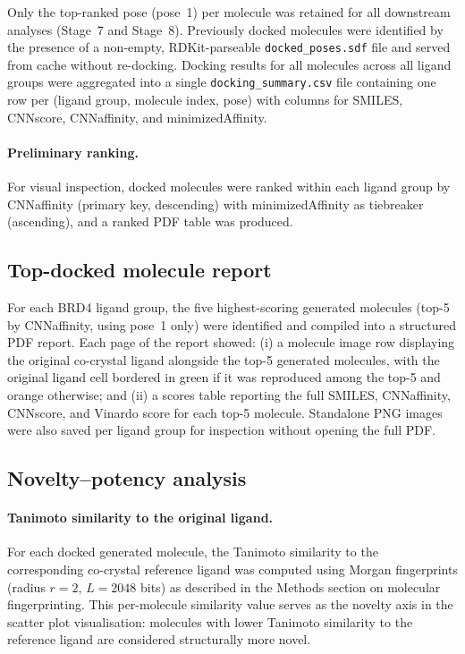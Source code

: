 \documentclass[a4paper,12pt]{article}
\begin{document}
\noindent Only the top-ranked pose (pose~1) per molecule was retained
for all downstream analyses (Stage~7 and Stage~8).
Previously docked molecules were identified by the presence of a
non-empty, RDKit-parseable \texttt{docked\_poses.sdf} file and
served from cache without re-docking.
Docking results for all molecules across all ligand groups were
aggregated into a single \texttt{docking\_summary.csv} file
containing one row per (ligand group, molecule index, pose) with
columns for SMILES, CNNscore, CNNaffinity, and minimizedAffinity.
 
\paragraph{Preliminary ranking.}
For visual inspection, docked molecules were ranked within each
ligand group by CNNaffinity (primary key, descending) with
minimizedAffinity as tiebreaker (ascending), and a ranked PDF
table was produced.
 
\subsection{Top-docked molecule report }
 
For each BRD4 ligand group, the five highest-scoring generated
molecules (top-5 by CNNaffinity, using pose~1 only) were
identified and compiled into a structured PDF report.
Each page of the report showed: (i) a molecule image row
displaying the original co-crystal ligand alongside the
top-5 generated molecules, with the original ligand
cell bordered in green if it was reproduced among the top-5
and orange otherwise; and (ii) a scores table reporting the
full SMILES, CNNaffinity, CNNscore, and Vinardo score for each
top-5 molecule.
Standalone PNG images were also saved per ligand group for
inspection without opening the full PDF.
 
\subsection{Novelty--potency analysis}
 
\paragraph{Tanimoto similarity to the original ligand.}
For each docked generated molecule, the Tanimoto similarity
to the corresponding co-crystal reference ligand was computed
using Morgan fingerprints (radius $r = 2$, $L = 2048$ bits)
as described in the Methods section on molecular fingerprinting.
This per-molecule similarity value serves as the novelty axis
in the scatter plot visualisation: molecules with lower Tanimoto
similarity to the reference ligand are considered structurally
more novel.
 
\end{document}
